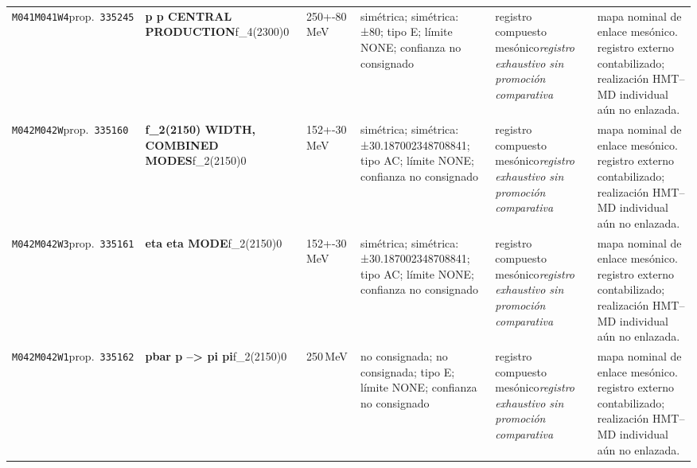 \begin{landscape}
\begin{longtable}{L{1.85cm}L{4.45cm}L{2.35cm}L{4.05cm}L{3.35cm}L{7.15cm}}
\texttt{M041}\newline \texttt{M041W4}\newline prop.\ \texttt{335245} & \textbf{p p CENTRAL PRODUCTION}\newline f\_\allowbreak{}4(2300)0 & 250+-80\,MeV & simétrica; simétrica: ±80; tipo E; límite NONE; confianza no consignado & registro compuesto mesónico\newline \emph{registro exhaustivo sin promoción comparativa} & mapa nominal de enlace mesónico. registro externo contabilizado; realización HMT--MD individual aún no enlazada. \\
\texttt{M042}\newline \texttt{M042W}\newline prop.\ \texttt{335160} & \textbf{f\_\allowbreak{}2(2150) WIDTH, COMBINED MODES}\newline f\_\allowbreak{}2(2150)0 & 152+-30\,MeV & simétrica; simétrica: ±30.187002348708841; tipo AC; límite NONE; confianza no consignado & registro compuesto mesónico\newline \emph{registro exhaustivo sin promoción comparativa} & mapa nominal de enlace mesónico. registro externo contabilizado; realización HMT--MD individual aún no enlazada. \\
\texttt{M042}\newline \texttt{M042W3}\newline prop.\ \texttt{335161} & \textbf{eta eta MODE}\newline f\_\allowbreak{}2(2150)0 & 152+-30\,MeV & simétrica; simétrica: ±30.187002348708841; tipo AC; límite NONE; confianza no consignado & registro compuesto mesónico\newline \emph{registro exhaustivo sin promoción comparativa} & mapa nominal de enlace mesónico. registro externo contabilizado; realización HMT--MD individual aún no enlazada. \\
\texttt{M042}\newline \texttt{M042W1}\newline prop.\ \texttt{335162} & \textbf{pbar p --\textgreater{} pi pi}\newline f\_\allowbreak{}2(2150)0 & 250\,MeV & no consignada; no consignada; tipo E; límite NONE; confianza no consignado & registro compuesto mesónico\newline \emph{registro exhaustivo sin promoción comparativa} & mapa nominal de enlace mesónico. registro externo contabilizado; realización HMT--MD individual aún no enlazada. \\

\end{longtable}
\end{landscape}
